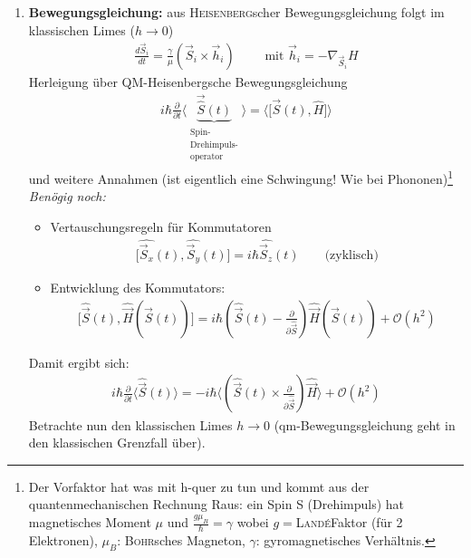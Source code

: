 \documentclass[12pt]{article}
\begin{document}
 \begin{enumerate}
 \item \textbf{Bewegungsgleichung:} aus \textsc{Heisenberg}scher Bewegungsgleichung folgt im klassischen Limes ($h \to 0$)
  \begin{align}
\frac{d \vec{S}_i}{dt} = \frac{\gamma}{\mu } ( \vec{S}_i \times \vec{h}_i ) \qquad \mbox{ mit } \vec{h}_i = - \nabla_{\vec{S}_i} H
  \end{align}
  Herleigung über QM-Heisenbergsche Bewegungsgleichung
  \begin{align*}
    i \hbar \frac{\partial}{\partial t} \langle \underbrace{\vec{\hat{S}}(t)}_{\substack{ \text{Spin-} \\ \text{Drehimpuls-} \\ \text{operator}}} \rangle = \langle \big[ \vec{S}(t) ,\hat{H}\big] \rangle
  \end{align*}
  und weitere Annahmen (ist eigentlich eine Schwingung! Wie bei Phononen)\footnote{Der Vorfaktor hat was mit h-quer zu tun und kommt aus der quantenmechanischen Rechnung Raus: ein Spin S (Drehimpuls) hat magnetisches Moment $\mu$ und $\frac{g \mu_B}{\hbar}= \gamma$ wobei $g=$\textsc{Landé}Faktor (für 2 Elektronen), $\mu_B$: \textsc{Bohr}sches Magneton, $\gamma$: gyromagnetisches Verhältnis.} \\
  \textit{Benögig noch:}
  \begin{itemize}
  \item Vertauschungsregeln für Kommutatoren
  \begin{align*}
  \big[ \hat{\vec{S}_x} (t), \hat{\vec{S}_y} (t) \big] = i \hbar \hat{\vec{S}_z} (t) \qquad \text{(zyklisch)}
  \end{align*}
  \item Entwicklung des Kommutators:
  \begin{align*}
  \big[ \hat{\vec{S}} (t), \hat{\vec{H}}(\hat{\vec{S}} (t)) \big] =
  i \hbar \left( \hat{\vec{S}}(t) - \frac{\partial}{\partial \hat{\vec{S} }}\right) \hat{\vec{H}} ( \hat{\vec{S}}(t) )+ \mathcal{O} (h^2) 
  \end{align*} %
  \end{itemize}
  Damit ergibt sich: 
  \begin{align*}
  i \hbar \frac{\partial}{\partial t} \langle \hat{\vec{S}}(t) \rangle = - i \hbar \langle \left( \hat{\vec{S}} (t) \times \frac{\partial}{\partial \hat{\vec{S}}} \right) \hat{\vec{H}} \rangle + \mathcal{O}(h^2)
  \end{align*}
  Betrachte nun den klassischen Limes $h \to 0$ (qm-Bewegungsgleichung geht in den klassischen Grenzfall über).

\end{enumerate}
\end{document}
